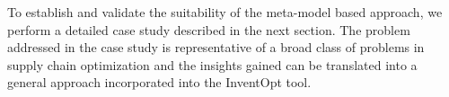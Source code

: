     To establish and validate the suitability of the meta-model based approach, we perform a detailed case study described in the next section. The problem addressed in the case study is representative of a broad class of problems in supply chain optimization and the insights gained can be translated into a general approach incorporated into the InventOpt tool.
    
    
  
 